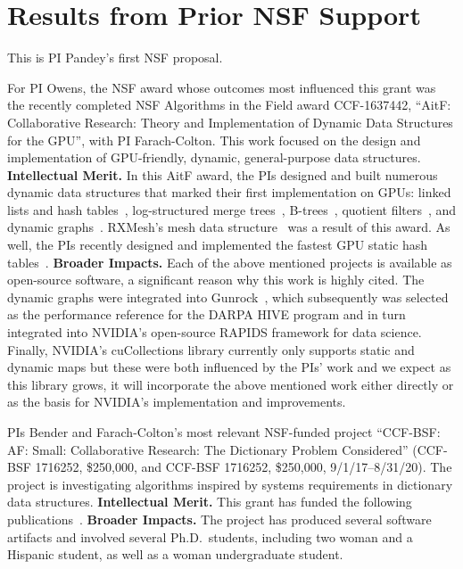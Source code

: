 \section{Results from Prior NSF Support}

This is PI Pandey's first NSF proposal.

For PI Owens, the NSF award whose outcomes most influenced this grant was the recently completed NSF Algorithms in the Field award CCF-1637442, ``AitF\@: Collaborative Research: Theory and Implementation of Dynamic Data Structures for the GPU'', with PI Farach-Colton. This work focused on the design and implementation of GPU-friendly, dynamic, general-purpose data structures.
\textbf{Intellectual Merit.} In this AitF award, the PIs designed and built numerous dynamic data structures that marked their first implementation on GPUs: linked lists and hash tables~\cite{Ashkiani:2018:ADH}, log-structured merge trees~\cite{Ashkiani:2018:GLA}, B-trees~\cite{Awad:2019:EAH}, quotient filters~\cite{Geil:2018:QFA}, and dynamic graphs~\cite{Awad:2020:DGO}. RXMesh's mesh data structure~\cite{Mahmoud:2021:RAG} was a result of this award. As well, the PIs recently designed and implemented the fastest GPU static hash tables~\cite{Awad:2023:AAI}.
%
\textbf{Broader Impacts.} Each of the above mentioned projects is available as open-source software, a significant reason why this work is highly cited. The dynamic graphs were integrated into Gunrock~\cite{Awad:2020:DGO,Wang:2017:GGG}, which subsequently was selected as the performance reference for the DARPA HIVE program and in turn integrated into NVIDIA's open-source RAPIDS framework for data science. Finally, NVIDIA's cuCollections library currently only supports static and dynamic maps but these were both influenced by the PIs' work and we expect as this library grows, it will incorporate the above mentioned work either directly or as the basis for NVIDIA's implementation and improvements.

PIs Bender and Farach-Colton's most relevant NSF-funded project ``CCF-BSF\@: AF\@: Small: Collaborative Research: The Dictionary Problem Considered''
(CCF-BSF 1716252, \$250,000, and CCF-BSF 1716252, \$250,000, 9/1/17--8/31/20).
The project is investigating algorithms inspired by systems requirements in dictionary data structures.
\textbf{Intellectual Merit.} This grant has funded the following
publications~\cite{AgrawalBeDa20,AgrawalBeFi20,%
ArkinDaGa20,Ashkiani:2018:ADH,Ashkiani:2018:GLA,BenderChDa20,BenderCoFa19,BenderDaJo20,BenderFaGo18,%
BenderFaKu19,BenderGoMe20,BenderKoKu20,ChenMcSi18,ConwayBaJi17b,ConwayFaSh18,ConwayKnJi19,%
DasAgBe20,DasTsDu19,BerceaEv20a,BerceaEv20b,%
ZhanCoJi18,ZhanJaPo18,Mayer18,Pandey19,PandeyABFJP18Cell,PandeyBJP17,%
PandeyBJP17a,PandeyBJP17b,Singh18,SinghMaBe20,%
JavanmardGaDa19DISC,%
GoswamiMeMe18,%
Geil:2018:QFA,pandey2020timely,%
EvenMeRa18,Awad:2019:EAH,BenderFiGi19,Farach-ColtonLiTs18,BenderKoPe18}.
%
\textbf{Broader Impacts.} The project has produced several software artifacts and involved several Ph.D.\ students, including two woman and a Hispanic student, as well as a woman undergraduate student.

